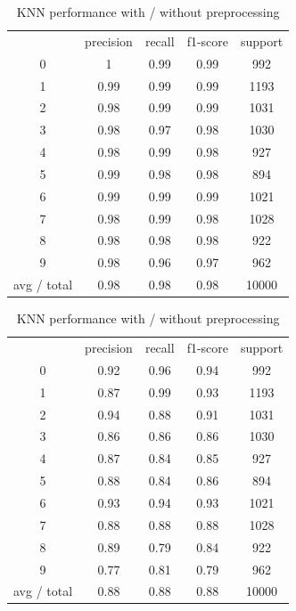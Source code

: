 \documentclass{article}
\begin{document}
\begin{table}[!htb]
	\centering
	\small 
	\caption{KNN performance with / without preprocessing}
		\begin{tabular}{ccccc}
			& precision & recall & f1-score & support \\
			0     & 1     & 0.99  & 0.99  & 992 \\
			1     & 0.99  & 0.99  & 0.99  & 1193 \\
			2     & 0.98  & 0.99  & 0.99  & 1031 \\
			3     & 0.98  & 0.97  & 0.98  & 1030 \\
			4     & 0.98  & 0.99  & 0.98  & 927 \\
			5     & 0.99  & 0.98  & 0.98  & 894 \\
			6     & 0.99  & 0.99  & 0.99  & 1021 \\
			7     & 0.98  & 0.99  & 0.98  & 1028 \\
			8     & 0.98  & 0.98  & 0.98  & 922 \\
			9     & 0.98  & 0.96  & 0.97  & 962 \\
			avg / total & 0.98  & 0.98  & 0.98  & 10000 \\
		\end{tabular}%
		\begin{tabular}{ccccc}
			& precision & recall & f1-score & support \\
			0     & 0.92  & 0.96  & 0.94  & 992 \\
			1     & 0.87  & 0.99  & 0.93  & 1193 \\
			2     & 0.94  & 0.88  & 0.91  & 1031 \\
			3     & 0.86  & 0.86  & 0.86  & 1030 \\
			4     & 0.87  & 0.84  & 0.85  & 927 \\
			5     & 0.88  & 0.84  & 0.86  & 894 \\
			6     & 0.93  & 0.94  & 0.93  & 1021 \\
			7     & 0.88  & 0.88  & 0.88  & 1028 \\
			8     & 0.89  & 0.79  & 0.84  & 922 \\
			9     & 0.77  & 0.81  & 0.79  & 962 \\
			avg / total & 0.88  & 0.88  & 0.88  & 10000 \\
		\end{tabular}%
	\label{tbl:KNN_with_score}%
\end{table}%
\end{document}
